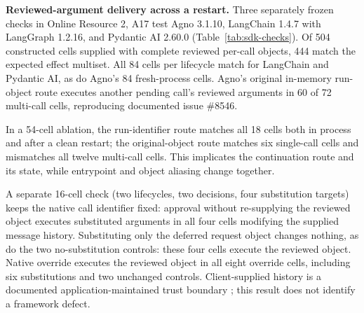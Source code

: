 \documentclass[pdflatex,sn-basic]{sn-jnl}
\begin{document}
\textbf{Reviewed-argument delivery across a restart.} Three separately frozen checks in Online Resource 2, A17 test Agno 3.1.10, LangChain 1.4.7 with LangGraph 1.2.16, and Pydantic AI 2.60.0 (Table~\ref{tab:sdk-checks}). Of 504 constructed cells supplied with complete reviewed per-call objects, 444 match the expected effect multiset. All 84 cells per lifecycle match for LangChain and Pydantic AI, as do Agno's 84 fresh-process cells. Agno's original in-memory run-object route executes another pending call's reviewed arguments in 60 of 72 multi-call cells, reproducing documented issue \#8546.

In a 54-cell ablation, the run-identifier route matches all 18 cells both in process and after a clean restart; the original-object route matches six single-call cells and mismatches all twelve multi-call cells. This implicates the continuation route and its state, while entrypoint and object aliasing change together.

A separate 16-cell check (two lifecycles, two decisions, four substitution targets) keeps the native call identifier fixed: approval without re-supplying the reviewed object executes substituted arguments in all four cells modifying the supplied message history. Substituting only the deferred request object changes nothing, as do the two no-substitution controls: these four cells execute the reviewed object. Native override executes the reviewed object in all eight override cells, including six substitutions and two unchanged controls. Client-supplied history is a documented application-maintained trust boundary \citep{pydantic-ai-docs}; this result does not identify a framework defect.
\end{document}
